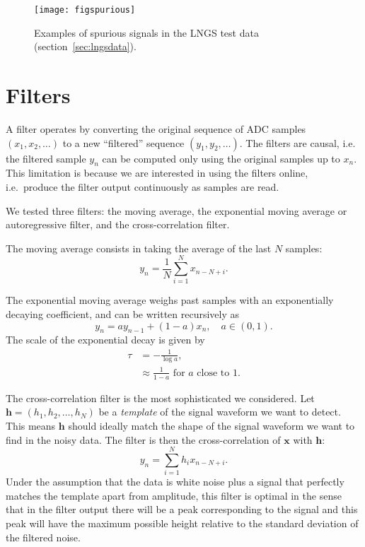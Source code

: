 \begin{figure}
    \hspace{-0.26\textwidth}\texttt{[image: figspurious]}
    
    \caption{Examples of spurious signals in the LNGS test data
    (section~\ref{sec:lngsdata}).}
    
    \label{fig:spurious}
\end{figure}

\section{Filters}
\label{sec:filters}

A filter operates by converting the original sequence of ADC samples $(x_1,
x_2, \ldots)$ to a new ``filtered'' sequence $(y_1, y_2, \ldots)$. The filters
are causal, i.e. the filtered sample $y_n$ can be computed only using the
original samples up to $x_n$. This limitation is because we are interested in
using the filters online, i.e.\ produce the filter output continuously as
samples are read.

We tested three filters: the moving average, the exponential moving average or
autoregressive filter, and the cross-correlation filter.

The moving average consists in taking the average of the last $N$ samples:
\begin{equation}
    y_n =  \frac1N \sum_{i=1}^N x_{n-N+i}.
\end{equation}

The exponential moving average weighs past samples with an exponentially
decaying coefficient, and can be written recursively as
\begin{equation}
    y_n = a y_{n-1} + (1 - a) x_n, \quad a \in (0, 1).
\end{equation}
The scale of the exponential decay is given by
\begin{align}
    \tau &= -\frac1{\log a}, \\
    &\approx \frac1{1-a} \text{ for $a$ close to 1.}
\end{align}

The cross-correlation filter is the most sophisticated we considered. Let
$\mathbf h = (h_1, h_2, \ldots, h_N)$ be a \emph{template} of the signal
waveform we want to detect. This means $\mathbf h$ should ideally match the
shape of the signal waveform we want to find in the noisy data. The filter is
then the cross-correlation of $\mathbf x$ with $\mathbf h$:
\begin{equation}
    y_n = \sum_{i=1}^N h_i x_{n-N+i}.
\end{equation}
Under the assumption that the data is white noise plus a signal that perfectly
matches the template apart from amplitude, this filter is optimal in the sense
that in the filter output there will be a peak corresponding to the signal and
this peak will have the maximum possible height relative to the standard
deviation of the filtered noise.

